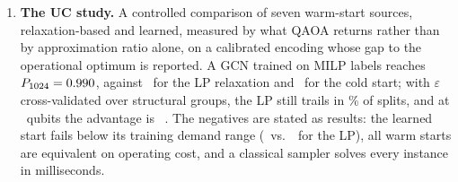 \begin{enumerate}
\item \textbf{The UC study.} A controlled comparison of seven warm-start sources, relaxation-based and learned, measured by what QAOA returns rather than by approximation ratio alone, on a calibrated encoding whose gap to the operational optimum is reported. A GCN trained on MILP labels reaches $P_{1024}=0.990$, against \PgndD\ for the LP relaxation and \PgndA\ for the cold start; with $\varepsilon$ cross-validated over structural groups, the LP still trails in \CVDMinusCmilpWorse\% of splits, and at \NLfour\ qubits the advantage is \LfourOwnCmilpMinusDTen\ \LfourOwnCmilpMinusDTenCI. The negatives are stated as results: the learned start fails below its training demand range (\OODLowC\ vs.\ \OODLowD\ for the LP), all warm starts are equivalent on operating cost, and a classical sampler solves every instance in milliseconds.
\end{enumerate}
